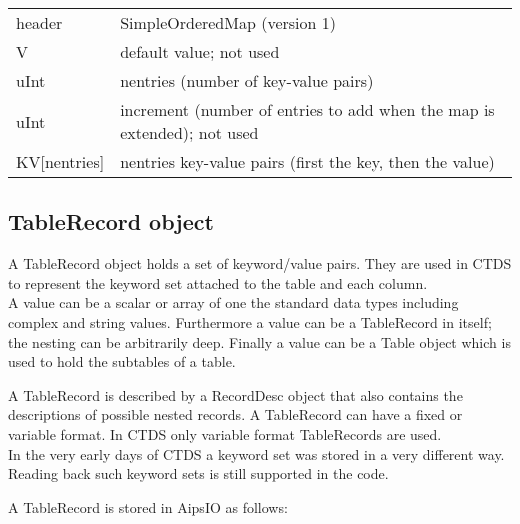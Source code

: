 \vspace{0.15in}
\begin{tabular}{|l|p{13cm}|} \hline
  header & SimpleOrderedMap (version 1) \\
  V & default value; not used\\
  uInt & nentries (number of key-value pairs) \\
  uInt & increment (number of entries to add when the map is
         extended); not used \\
  KV[nentries] & nentries key-value pairs (first the key, then the value) \\
  \hline
\end{tabular}
\vspace{0.15in}

 
\subsection{\label{CTDS:TABLERECORD}TableRecord object}
A TableRecord object holds a set of keyword/value pairs. They are used
in CTDS to represent the keyword set attached to the table and each column.
\\A value can be a scalar or array of one the standard data types including
complex and string values. Furthermore a value can be a TableRecord in
itself; the nesting can be arbitrarily deep. Finally a value can be
a Table object which is used to hold the subtables of a table.

A TableRecord is described by a RecordDesc object that also
contains the descriptions of possible nested records. A TableRecord
can have a fixed or variable format. In CTDS only variable format
TableRecords are used.
\\In the very early days of CTDS a keyword set was stored in a very
different way. Reading back such keyword sets is still supported in
the code.

A TableRecord is stored in AipsIO as follows:

